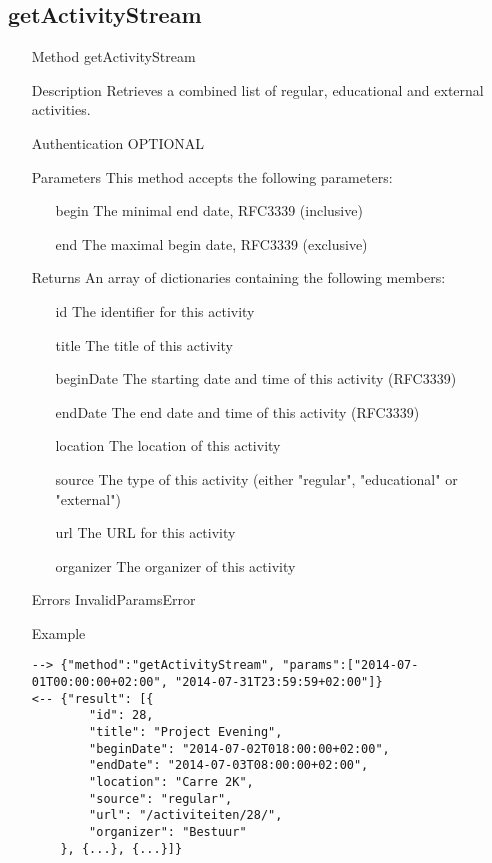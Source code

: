 \documentclass[a4paper]{scrreprt}
\begin{document}
\subsection{getActivityStream}\label{m:getActivityStream}
\begin{enumerate}
\item[Method] getActivityStream
\item[Description] Retrieves a combined list of regular, educational and external activities.
\item[Authentication] OPTIONAL
\item[Parameters] This method accepts the following parameters:
\begin{enumerate}
	\item[begin] The minimal end date, RFC3339 (inclusive)
    \item[end] The maximal begin date, RFC3339 (exclusive)
    \end{enumerate}
\item[Returns] An array of dictionaries containing the following members:
\begin{enumerate}
    \item[id] The identifier for this activity
    \item[title] The title of this activity
    \item[beginDate] The starting date and time of this activity (RFC3339)
    \item[endDate] The end date and time of this activity (RFC3339)
    \item[location] The location of this activity
    \item[source] The type of this activity (either "regular", "educational" or "external")
    \item[url] The URL for this activity
    \item[organizer] The organizer of this activity
	\end{enumerate}
\item[Errors] InvalidParamsError
\item[Example]
\begin{lstlisting}
--> {"method":"getActivityStream", "params":["2014-07-01T00:00:00+02:00", "2014-07-31T23:59:59+02:00"]}
<-- {"result": [{
        "id": 28,
        "title": "Project Evening",
        "beginDate": "2014-07-02T018:00:00+02:00",
        "endDate": "2014-07-03T08:00:00+02:00",
        "location": "Carre 2K",
        "source": "regular",
        "url": "/activiteiten/28/",
        "organizer": "Bestuur"
    }, {...}, {...}]}
\end{lstlisting}
\end{enumerate}
\end{document}
